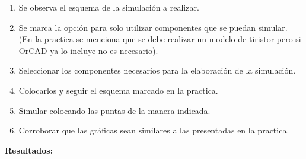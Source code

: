 \documentclass[letterpaper]{article}
\begin{document}
\begin{large}
        \begin{enumerate}
            \item Se observa el esquema de la simulación a realizar.
            \item Se marca la opción para solo utilizar componentes que se puedan simular.\\
                  (En la practica se menciona que se debe realizar un modelo de tiristor pero si OrCAD ya lo incluye no es necesario).
            \item Seleccionar los componentes necesarios para la elaboración de la simulación.
            \item Colocarlos y seguir el esquema marcado en la practica.
            \item Simular colocando las puntas de la manera indicada.
            \item Corroborar que las gráficas sean similares a las presentadas en la practica.
        \end{enumerate}
    \end{large}
\begin{LARGE}
\textbf{Resultados:}\\
\end{LARGE}
\end{document}
